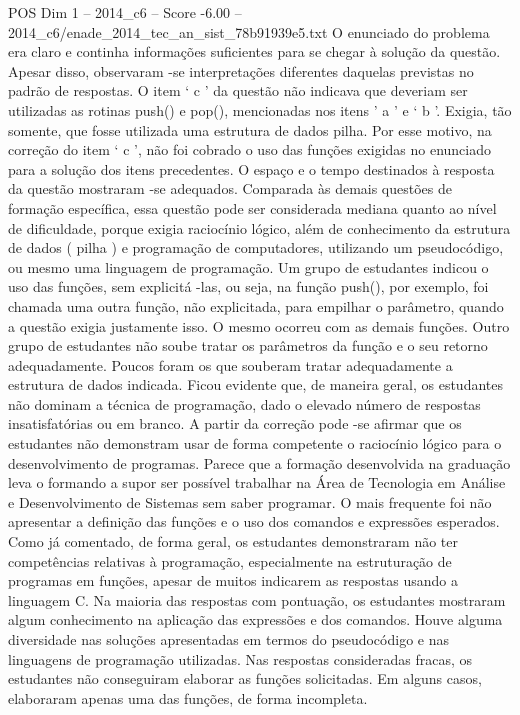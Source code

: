 \begin{textsample}{POS Dim 1 – 2014\_c6 – Score -6.00 – 2014\_c6/enade\_2014\_tec\_an\_sist\_78b91939e5.txt}
O enunciado do problema era claro e continha informações suficientes para se chegar à solução da questão.
Apesar disso, observaram -se interpretações diferentes daquelas previstas no padrão de respostas.
O item ‘ c ’ da questão não indicava que deveriam ser utilizadas as rotinas push() e pop(), mencionadas nos itens ’ a ’ e ‘ b ’.
Exigia, tão somente, que fosse utilizada uma estrutura de dados pilha.
Por esse motivo, na correção do item ‘ c ’, não foi cobrado o uso das funções exigidas no enunciado para a solução dos itens precedentes.
O espaço e o tempo destinados à resposta da questão mostraram -se adequados.
Comparada às demais questões de formação específica, essa questão pode ser considerada mediana quanto ao nível de dificuldade, porque exigia raciocínio lógico, além de conhecimento da estrutura de dados ( pilha ) e programação de computadores, utilizando um pseudocódigo, ou mesmo uma linguagem de programação.
Um grupo de estudantes indicou o uso das funções, sem explicitá -las, ou seja, na função push(), por exemplo, foi chamada uma outra função, não explicitada, para empilhar o parâmetro, quando a questão exigia justamente isso.
O mesmo ocorreu com as demais funções.
Outro grupo de estudantes não soube tratar os parâmetros da função e o seu retorno adequadamente.
Poucos foram os que souberam tratar adequadamente a estrutura de dados indicada.
Ficou evidente que, de maneira geral, os estudantes não dominam a técnica de programação, dado o elevado número de respostas insatisfatórias ou em branco.
A partir da correção pode -se afirmar que os estudantes não demonstram usar de forma competente o raciocínio lógico para o desenvolvimento de programas.
Parece que a formação desenvolvida na graduação leva o formando a supor ser possível trabalhar na Área de Tecnologia em Análise e Desenvolvimento de Sistemas sem saber programar.
O mais frequente foi não apresentar a definição das funções e o uso dos comandos e expressões esperados.
Como já comentado, de forma geral, os estudantes demonstraram não ter competências relativas à programação, especialmente na estruturação de programas em funções, apesar de muitos indicarem as respostas usando a linguagem C.
Na maioria das respostas com pontuação, os estudantes mostraram algum conhecimento na aplicação das expressões e dos comandos.
Houve alguma diversidade nas soluções apresentadas em termos do pseudocódigo e nas linguagens de programação utilizadas.
Nas respostas consideradas fracas, os estudantes não conseguiram elaborar as funções solicitadas.
Em alguns casos, elaboraram apenas uma das funções, de forma incompleta.

\end{textsample}

